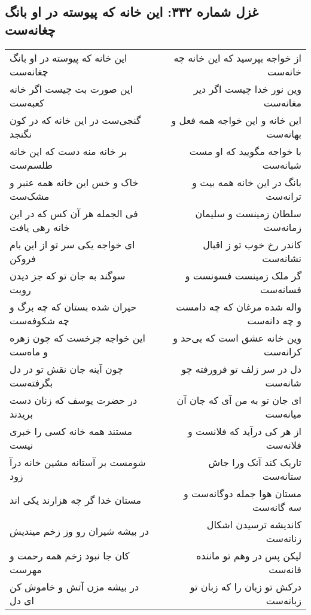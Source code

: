 \begin{center}
\section*{غزل شماره ۳۳۲: این خانه که پیوسته در او بانگ چغانه‌ست}
\label{sec:0332}
\begin{longtable}{l p{0.5cm} r}
این خانه که پیوسته در او بانگ چغانه‌ست
&&
از خواجه بپرسید که این خانه چه خانه‌ست
\\
این صورت بت چیست اگر خانه کعبه‌ست
&&
وین نور خدا چیست اگر دیر مغانه‌ست
\\
گنجی‌ست در این خانه که در کون نگنجد
&&
این خانه و این خواجه همه فعل و بهانه‌ست
\\
بر خانه منه دست که این خانه طلسم‌ست
&&
با خواجه مگویید که او مست شبانه‌ست
\\
خاک و خس این خانه همه عنبر و مشک‌ست
&&
بانگ در این خانه همه بیت و ترانه‌ست
\\
فی الجمله هر آن کس که در این خانه رهی یافت
&&
سلطان زمینست و سلیمان زمانه‌ست
\\
ای خواجه یکی سر تو از این بام فروکن
&&
کاندر رخ خوب تو ز اقبال نشانه‌ست
\\
سوگند به جان تو که جز دیدن رویت
&&
گر ملک زمینست فسونست و فسانه‌ست
\\
حیران شده بستان که چه برگ و چه شکوفه‌ست
&&
واله شده مرغان که چه دامست و چه دانه‌ست
\\
این خواجه چرخست که چون زهره و ماه‌ست
&&
وین خانه عشق است که بی‌حد و کرانه‌ست
\\
چون آینه جان نقش تو در دل بگرفته‌ست
&&
دل در سر زلف تو فرورفته چو شانه‌ست
\\
در حضرت یوسف که زنان دست بریدند
&&
ای جان تو به من آی که جان آن میانه‌ست
\\
مستند همه خانه کسی را خبری نیست
&&
از هر کی درآید که فلانست و فلانه‌ست
\\
شومست بر آستانه مشین خانه درآ زود
&&
تاریک کند آنک ورا جاش ستانه‌ست
\\
مستان خدا گر چه هزارند یکی اند
&&
مستان هوا جمله دوگانه‌ست و سه گانه‌ست
\\
در بیشه شیران رو وز زخم میندیش
&&
کاندیشه ترسیدن اشکال زنانه‌ست
\\
کان جا نبود زخم همه رحمت و مهرست
&&
لیکن پس در وهم تو ماننده فانه‌ست
\\
در بیشه مزن آتش و خاموش کن ای دل
&&
درکش تو زبان را که زبان تو زبانه‌ست
\\
\end{longtable}
\end{center}
